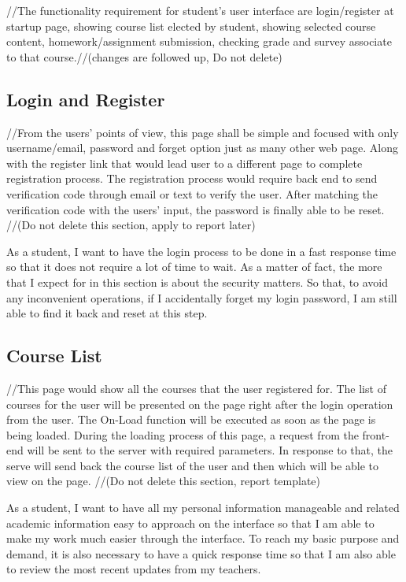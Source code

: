//The functionality requirement for student's user interface are login/register at startup page, showing course list elected by student, showing selected course content, homework/assignment submission, checking grade and survey associate to that course.//(changes are followed up, Do not delete)


\subsection{Login and Register}
//From the users' points of view, this page shall be simple and focused with only username/email, password and forget option just as many other web page. Along with the register link that would lead user to a different page to complete registration process. The registration process would require back end to send verification code through email or text to verify the user. After matching the verification code with the users' input, the password is finally able to be reset. //(Do not delete this section, apply to report later)


As a student, I want to have the login process to be done in a fast response time so that it does not require a lot of time to wait. As a matter of fact, the more that I expect for in this section is about the security matters. So that, to avoid any inconvenient operations, if I accidentally forget my login password, I am still able to find it back and reset at this step.
\subsection{Course List}
//This page would show all the courses that the user registered for. The list of courses for the user will be presented on the page right after the login operation from the user. The On-Load function will be executed as soon as the page is being loaded. During the loading process of this page, a request from the front-end will be sent to the server with required parameters. In response to that, the serve will send back the course list of the user and then which will be able to view on the page. //(Do not delete this section, report template)


As a student, I want to have all my personal information manageable and related academic information easy to approach on the interface so that I am able to make my work much easier through the interface. To reach my basic purpose and demand, it is also necessary to have a quick response time so that I am also able to review the most recent updates from my teachers.

